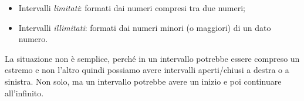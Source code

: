 \begin{itemize} [noitemsep]
\item Intervalli \emph{limitati}: formati dai numeri compresi tra due 
numeri;
\item Intervalli \emph{illimitati}: formati dai numeri minori (o maggiori) 
di un dato numero.
\end{itemize}
% 

La situazione non è semplice, perché in un intervallo potrebbe essere 
compreso un estremo e non l'altro quindi possiamo avere intervalli 
aperti/chiusi a destra o a sinistra. 
Non solo, ma un intervallo potrebbe avere un inizio e poi continuare 
all'infinito.

